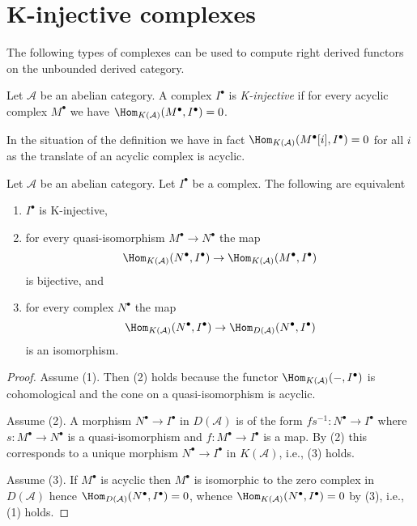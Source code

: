 \section{K-injective complexes}
\label{section-K-injective}

\noindent
The following types of complexes can be used to compute right derived
functors on the unbounded derived category.

\begin{definition}
\label{definition-K-injective}
Let $\mathcal{A}$ be an abelian category. A complex $I^\bullet$
is {\it K-injective} if for every acyclic complex $M^\bullet$ we
have $\Hom_{K(\mathcal{A})}(M^\bullet, I^\bullet) = 0$.
\end{definition}

\noindent
In the situation of the definition we have in fact
$\Hom_{K(\mathcal{A})}(M^\bullet[i], I^\bullet) = 0$ for all $i$
as the translate of an acyclic complex is acyclic.

\begin{lemma}
\label{lemma-K-injective}
Let $\mathcal{A}$ be an abelian category.
Let $I^\bullet$ be a complex. The following are equivalent
\begin{enumerate}
\item $I^\bullet$ is K-injective,
\item for every quasi-isomorphism $M^\bullet \to N^\bullet$ the map
$$
\Hom_{K(\mathcal{A})}(N^\bullet, I^\bullet)
\to \Hom_{K(\mathcal{A})}(M^\bullet, I^\bullet)
$$
is bijective, and
\item for every complex $N^\bullet$ the map
$$
\Hom_{K(\mathcal{A})}(N^\bullet, I^\bullet)
\to \Hom_{D(\mathcal{A})}(N^\bullet, I^\bullet)
$$
is an isomorphism.
\end{enumerate}
\end{lemma}

\begin{proof}
Assume (1). Then (2) holds because the functor
$\Hom_{K(\mathcal{A})}( - , I^\bullet)$ is cohomological
and the cone on a quasi-isomorphism is acyclic.

\medskip\noindent
Assume (2). A morphism $N^\bullet \to I^\bullet$ in $D(\mathcal{A})$
is of the form $fs^{-1} : N^\bullet \to I^\bullet$ where
$s : M^\bullet \to N^\bullet$ is a quasi-isomorphism and
$f : M^\bullet \to I^\bullet$ is a map. By (2) this corresponds to
a unique morphism $N^\bullet \to I^\bullet$ in $K(\mathcal{A})$, i.e.,
(3) holds.

\medskip\noindent
Assume (3). If $M^\bullet$ is acyclic then $M^\bullet$ is isomorphic
to the zero complex in $D(\mathcal{A})$ hence
$\Hom_{D(\mathcal{A})}(N^\bullet, I^\bullet) = 0$, whence
$\Hom_{K(\mathcal{A})}(N^\bullet, I^\bullet) = 0$ by (3),
i.e., (1) holds.
\end{proof}

